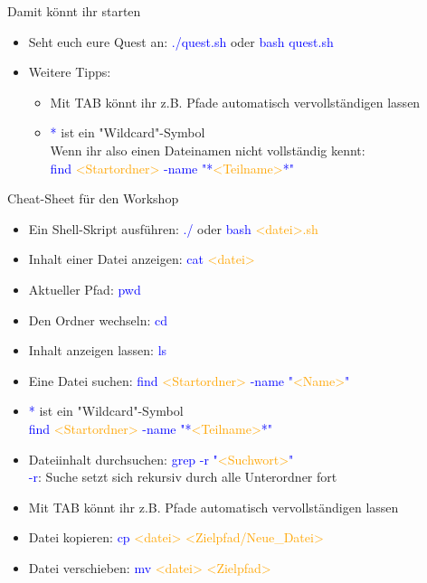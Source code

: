 \documentclass[t, xcolor=dvipsnames]{beamer}
\begin{document}
\begin{frame}{Damit könnt ihr starten}
    \begin{itemize}
        \item Seht euch eure Quest an: \textcolor{blue}{./quest.sh} oder \textcolor{blue}{bash quest.sh}
        \item Weitere Tipps: 
        \begin{itemize}
            \item Mit TAB könnt ihr z.B. Pfade automatisch vervollständigen lassen
            \item \textcolor{blue}{*} ist ein "Wildcard"-Symbol \\
            Wenn ihr also einen Dateinamen nicht vollständig kennt:\\
            \textcolor{blue}{find} \textcolor{orange}{<Startordner>} \textcolor{blue}{-name "*}\textcolor{orange}{<Teilname>}\textcolor{blue}{*"}
        \end{itemize}
        
    \end{itemize}
\end{frame}

\begin{frame}{Cheat-Sheet für den Workshop}
    \begin{itemize}
        \item Ein Shell-Skript ausführen: \textcolor{blue}{./} oder \textcolor{blue}{bash} \textcolor{orange}{<datei>.sh}
        \item Inhalt einer Datei anzeigen: \textcolor{blue}{cat} \textcolor{orange}{<datei>}
        \item Aktueller Pfad: \textcolor{blue}{pwd}
        \item Den Ordner wechseln: \textcolor{blue}{cd}
        \item Inhalt anzeigen lassen: \textcolor{blue}{ls}
        \item Eine Datei suchen: \textcolor{blue}{find} \textcolor{orange}{<Startordner>} \textcolor{blue}{-name "}\textcolor{orange}{<Name>}\textcolor{blue}{"}
        \item \textcolor{blue}{*} ist ein "Wildcard"-Symbol \\
        \textcolor{blue}{find} \textcolor{orange}{<Startordner>} \textcolor{blue}{-name "*}\textcolor{orange}{<Teilname>}\textcolor{blue}{*"}
        \item Dateiinhalt durchsuchen: \textcolor{blue}{grep -r "}\textcolor{orange}{<Suchwort>}\textcolor{blue}{"} \\ \textcolor{blue}{-r}: Suche setzt sich rekursiv durch alle Unterordner fort
        \item Mit TAB könnt ihr z.B. Pfade automatisch vervollständigen lassen
        \item Datei kopieren: \textcolor{blue}{cp} \textcolor{orange}{<datei> <Zielpfad/Neue\_Datei>}
        \item Datei verschieben: \textcolor{blue}{mv} \textcolor{orange}{<datei> <Zielpfad>}
    \end{itemize}
\end{frame}
\end{document}
